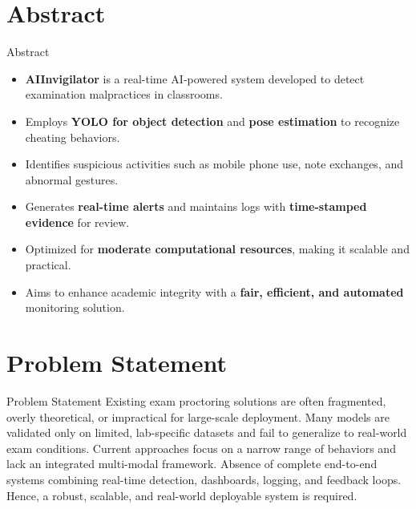 \documentclass{beamer}
\begin{document}
\section{Abstract}
\begin{frame}{Abstract}
\begin{itemize}
    \item \textbf{AIInvigilator} is a real-time AI-powered system developed to detect examination malpractices in classrooms.
    \item Employs \textbf{YOLO for object detection} and \textbf{pose estimation} to recognize cheating behaviors.
    \item Identifies suspicious activities such as mobile phone use, note exchanges, and abnormal gestures.
    \item Generates \textbf{real-time alerts} and maintains logs with \textbf{time-stamped evidence} for review.
    \item Optimized for \textbf{moderate computational resources}, making it scalable and practical.
    \item Aims to enhance academic integrity with a \textbf{fair, efficient, and automated} monitoring solution.
\end{itemize}
\end{frame}

\section{Problem Statement}
\begin{frame}{Problem Statement}
Existing exam proctoring solutions are often fragmented, overly theoretical, or impractical for large-scale deployment. Many models are validated only on limited, lab-specific datasets and fail to generalize to real-world exam conditions. Current approaches focus on a narrow range of behaviors and lack an integrated multi-modal framework. Absence of complete end-to-end systems combining real-time detection, dashboards, logging, and feedback loops. Hence, a robust, scalable, and real-world deployable system is required.
\end{frame}

\end{document}
